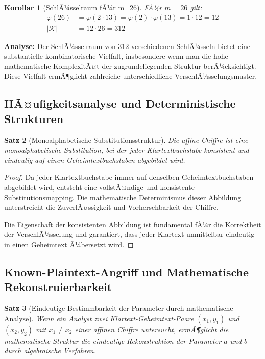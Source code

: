 ﻿\documentclass[12pt,a4paper]{article}
\newtheorem{theorem}{Satz}
\newtheorem{corollary}[theorem]{Korollar}
\begin{document}
	\begin{corollary}[SchlÃ¼sselraum fÃ¼r m=26]
		FÃ¼r $m = 26$ gilt:
		\begin{align}
			\varphi(26) &= \varphi(2 \cdot 13) = \varphi(2) \cdot \varphi(13) = 1 \cdot 12 = 12 \\
			|\mathcal{K}| &= 12 \cdot 26 = 312
		\end{align}
	\end{corollary}
	
	\textbf{Analyse:} Der SchlÃ¼sselraum von 312 verschiedenen SchlÃ¼sseln bietet eine substantielle kombinatorische Vielfalt, insbesondere wenn man die hohe mathematische KomplexitÃ¤t der zugrundeliegenden Struktur berÃ¼cksichtigt. Diese Vielfalt ermÃ¶glicht zahlreiche unterschiedliche VerschlÃ¼sselungsmuster.
	
	\subsection{HÃ¤ufigkeitsanalyse und Deterministische Strukturen}
	
	\begin{theorem}[Monoalphabetische Substitutionsstruktur]
		Die affine Chiffre ist eine monoalphabetische Substitution, bei der jeder Klartextbuchstabe konsistent und eindeutig auf einen Geheimtextbuchstaben abgebildet wird.
	\end{theorem}
	
	\begin{proof}
		Da jeder Klartextbuchstabe immer auf denselben Geheimtextbuchstaben abgebildet wird, entsteht 
		eine vollstÃ¤ndige und konsistente Substitutionsmapping. Die mathematische Determinismus dieser Abbildung unterstreicht die ZuverlÃ¤ssigkeit und Vorhersehbarkeit der Chiffre.
		
		Die Eigenschaft der konsistenten Abbildung ist fundamental fÃ¼r die Korrektheit der VerschlÃ¼sselung und garantiert, dass jeder Klartext unmittelbar eindeutig in einen Geheimtext Ã¼bersetzt wird.
	\end{proof}
	
	\subsection{Known-Plaintext-Angriff und Mathematische Rekonstruierbarkeit}
	
	\begin{theorem}[Eindeutige Bestimmbarkeit der Parameter durch mathematische Analyse]
		Wenn ein Analyst zwei Klartext-Geheimtext-Paare $(x_1, y_1)$ und $(x_2, y_2)$ mit $x_1 \neq x_2$ einer affinen Chiffre untersucht, ermÃ¶glicht die mathematische Struktur die eindeutige Rekonstruktion der Parameter $a$ und $b$ durch algebraische Verfahren.
	\end{theorem}
	
\end{document}
